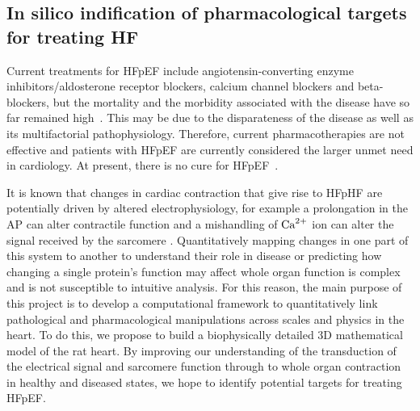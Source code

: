 %
%
%
\subsection{In silico indification of pharmacological targets for treating HF}
Current treatments for HFpEF include angiotensin-converting enzyme inhibitors/aldosterone receptor blockers, calcium channel
blockers and beta-blockers, but the mortality and the morbidity associated with the
disease have so far remained high~\cite{Adamczak:2020}. This may be due to the disparateness of the disease as well as its multifactorial pathophysiology. Therefore, current pharmacotherapies are not effective and patients with HFpEF are
currently considered the larger unmet need in cardiology. At present, there is no cure for HFpEF~\cite{Owan:2006}.

\vspace{0.2cm}
It is known that changes in cardiac contraction that give rise to HFpHF are potentially driven by altered electrophysiology, for example a prolongation in the AP can alter contractile function and a mishandling of $\textrm{Ca}^{2+}$ ion can alter the signal received by the sarcomere \cite{Asp:2013, Gorski:2015}. Quantitatively mapping changes in one part of this system to another to understand their role in disease or predicting how changing a single protein's function may affect whole organ function is complex and is not susceptible to intuitive analysis. For this reason, the main purpose of this project is to develop a computational framework to quantitatively link pathological and pharmacological manipulations across scales and physics in the heart. To do this, we propose to build a biophysically detailed $3$D mathematical model of the rat heart. By improving our understanding of the transduction of the electrical signal and sarcomere function through to whole organ contraction in healthy and diseased states, we hope to identify potential targets for treating HFpEF.













